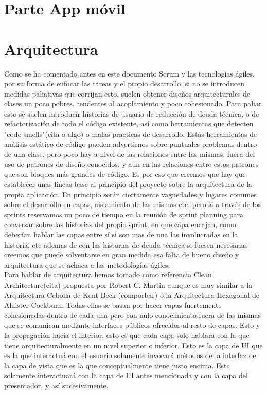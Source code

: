 \documentclass[../pfc.tex]{subfiles}
\begin{document}
	
	
	\section{Parte App móvil}
	
	\section{Arquitectura}
	
	Como se ha comentado antes en este documento Scrum y las tecnologías ágiles, por su forma de enfocar las tareas y el propio desarrollo, si no se introducen medidas paliativas que corrijan esto, suelen obtener diseños arquitecturales de clases un poco pobres, tendentes al acoplamiento y poco cohesionado. Para paliar esto se suelen introducir historias de usuario de reducción de deuda técnica, o de refactorización de todo el código existente, así como herramientas que detecten "code smells"(cita o algo) o malas practicas de desarrollo. Estas herramientas de análisis estático de código pueden advertirnos sobre puntuales problemas dentro de una clase, pero poco hay a nivel de las relaciones entre las mismas, fuera del uso de patrones de diseño conocidos, y aun en las relaciones entre estos patrones que son bloques más grandes de código. Es por eso que creemos que hay que establecer unas líneas base al principio del proyecto sobre la arquitectura de la propia aplicación. En principio serán ciertamente vaguedades y lugares comunes sobre el desarrollo en capas, aislamiento de las mismas etc, pero si a través de los sprints reservamos un poco de tiempo en la reunión de sprint planning para conversar sobre las historias del propio sprint, en que capa encajan, como deberían hablar las capas entre sí si son mas de una las involucradas en la historia, etc ademas de con las historias de deuda técnica si fuesen necesarias creemos que puede solventarse en gran medida esa falta de bueno diseño y arquitectura que se achaca a las metodologías ágiles.\\
	
	Para hablar de arquitectura hemos tomado como referencia Clean Architecture(cita) propuesta por Robert C. Martin aunque es muy similar a la Arquitectura Cebolla de Kent Beck (comporbar) o la Arquitectura Hexagonal de Alaister Cockburn. Todas ellas se basan por hacer capas fuertemente cohesionadas dentro de cada una pero con nulo conocimiento fuera de las mismas que se comunican mediante interfaces públicos ofrecidos al resto de capas. Esto y la propagación hacia el interior, esto es que cada capa solo hablara con la que tiene arquitecturalmente en un nivel superior o inferior. Esto es la capa de UI que es la que interactuá con el usuario solamente invocará métodos de la interfaz de la capa de vista que es la que conceptualmente tiene justo encima. Esta solamente interactuará con la capa de UI antes mencionada y con la capa del presentador, y así sucesivamente. 
	
\end{document}
